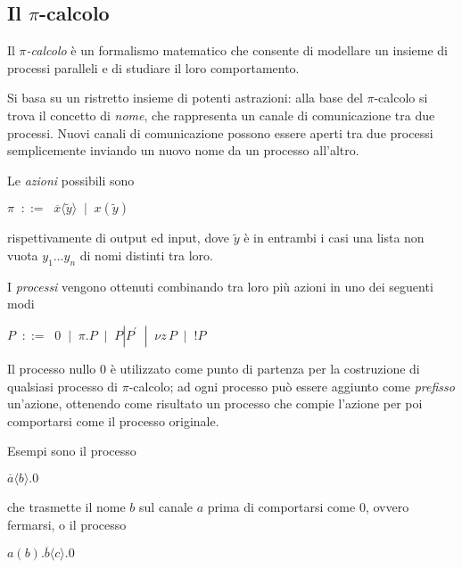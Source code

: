 \subsection{Il \texorpdfstring{$\pi$}{pi}-calcolo}

Il \emph{$\pi$-calcolo} \`e un formalismo matematico che consente di
modellare un insieme di processi paralleli e di studiare il loro
comportamento.

Si basa su un ristretto insieme di potenti astrazioni: alla base del
$\pi$-calcolo si trova il concetto di \emph{nome}, che rappresenta un
canale di comunicazione tra due processi. Nuovi canali di comunicazione
possono essere aperti tra due processi semplicemente inviando un nuovo
nome da un processo all'altro.

Le \emph{azioni} possibili sono

\begin{pilisting}
$
    \pi \;\; ::= \;\; \overline{x}\langle\tilde{y}\rangle
        \;\; |   \;\; x(\tilde{y})
$
\end{pilisting}

rispettivamente di output ed input, dove $\tilde{y}$ \`e in entrambi i casi
una lista non vuota $ y_1 \ldots y_n$ di nomi distinti tra loro.

I \emph{processi} vengono ottenuti combinando tra loro pi\`u azioni in uno
dei seguenti modi

\begin{pilisting}
$
    P \;\; ::= \;\; 0
      \;\; |   \;\; \pi.P
      \;\; |   \;\; P|P^{'}
      \;\; |   \;\; \nu z \, P
      \;\; |   \;\; !P
$
\end{pilisting}

Il processo nullo $0$ \`e utilizzato come punto di partenza per la
costruzione di qualsiasi processo di $\pi$-calcolo; ad ogni processo pu\`o
essere aggiunto come \emph{prefisso} un'azione, ottenendo come risultato un
processo che compie l'azione per poi comportarsi come il processo originale.

Esempi sono il processo

\begin{pilisting}
$
    \overline{a}\langle b\rangle.0
$
\end{pilisting}

che trasmette il nome $b$ sul canale $a$ prima di comportarsi come $0$,
ovvero fermarsi, o il processo

\begin{pilisting}
$
    a(b).\overline{b}\langle c\rangle.0
$
\end{pilisting}

